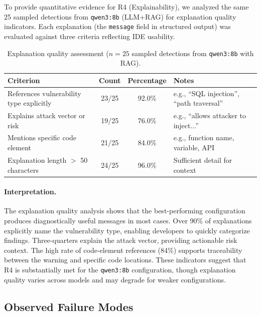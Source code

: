To provide quantitative evidence for R4 (Explainability), we analyzed the same 25 sampled detections from \texttt{qwen3:8b} (LLM+RAG) for explanation quality indicators. Each explanation (the \texttt{message} field in structured output) was evaluated against three criteria reflecting IDE usability.

\begin{table}[H]
  \centering
  \caption{Explanation quality assessment ($n=25$ sampled detections from \texttt{qwen3:8b} with RAG).}
  \label{tab:explanation-quality}
  \footnotesize
  \renewcommand{\arraystretch}{1.15}
  \begin{tabular}{p{}ccp{}}
    \toprule
    Criterion & Count & Percentage & Notes \\
    \midrule
    References vulnerability type explicitly & 23/25 & 92.0\% & e.g., ``SQL injection'', ``path traversal'' \\
    Explains attack vector or risk & 19/25 & 76.0\% & e.g., ``allows attacker to inject...'' \\
    Mentions specific code element & 21/25 & 84.0\% & e.g., function name, variable, API \\
    Explanation length $>$ 50 characters & 24/25 & 96.0\% & Sufficient detail for context \\
    \bottomrule
  \end{tabular}
\end{table}

\paragraph{Interpretation.}
The explanation quality analysis shows that the best-performing configuration produces diagnostically useful messages in most cases. Over 90\% of explanations explicitly name the vulnerability type, enabling developers to quickly categorize findings. Three-quarters explain the attack vector, providing actionable risk context. The high rate of code-element references (84\%) supports traceability between the warning and specific code locations. These indicators suggest that R4 is substantially met for the \texttt{qwen3:8b} configuration, though explanation quality varies across models and may degrade for weaker configurations.

\subsection*{Observed Failure Modes}

